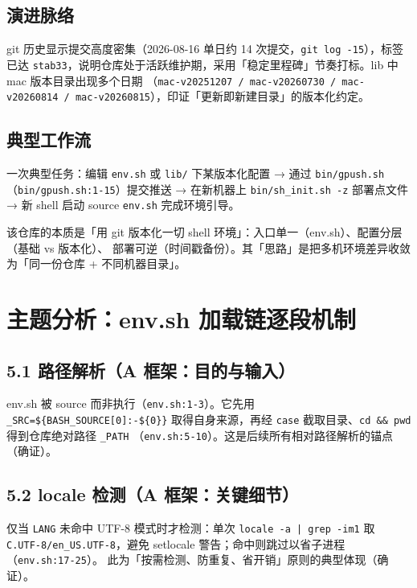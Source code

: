 \documentclass[UTF8]{ctexart}
\begin{document}
\subsection{演进脉络}
git 历史显示提交高度密集（2026-08-16 单日约 14 次提交，\texttt{\nolinkurl{git log -15}}），标签已达
\texttt{stab33}，说明仓库处于活跃维护期，采用「稳定里程碑」节奏打标。lib 中 mac 版本目录出现多个日期
（\texttt{mac-v20251207 / mac-v20260730 / mac-v20260814 / mac-v20260815}），印证「更新即新建目录」的版本化约定。

\subsection{典型工作流}
一次典型任务：编辑 \texttt{env.sh} 或 \texttt{lib/} 下某版本化配置 → 通过 \texttt{bin/gpush.sh}
（\texttt{\nolinkurl{bin/gpush.sh:1-15}}）提交推送 → 在新机器上 \texttt{bin/sh\_init.sh -z} 部署点文件 →
新 shell 启动 source \texttt{env.sh} 完成环境引导。

\begin{ideabox}
该仓库的本质是「用 git 版本化一切 shell 环境」：入口单一（env.sh）、配置分层（基础 vs 版本化）、
部署可逆（时间戳备份）。其「思路」是把多机环境差异收敛为「同一份仓库 + 不同机器目录」。
\end{ideabox}

\section{主题分析：env.sh 加载链逐段机制}
\subsection{5.1 路径解析（A 框架：目的与输入）}
env.sh 被 source 而非执行（\texttt{\nolinkurl{env.sh:1-3}}）。它先用 \texttt{\_SRC=\$\{BASH\_SOURCE[0]:-\$\{0\}\}}
取得自身来源，再经 \texttt{case} 截取目录、\texttt{cd \&\& pwd} 得到仓库绝对路径 \texttt{\_PATH}
（\texttt{\nolinkurl{env.sh:5-10}}）。这是后续所有相对路径解析的锚点（确证）。


\subsection{5.2 locale 检测（A 框架：关键细节）}
仅当 \texttt{LANG} 未命中 UTF-8 模式时才检测：单次 \texttt{locale -a | grep -im1} 取
\texttt{C.UTF-8/en\_US.UTF-8}，避免 setlocale 警告；命中则跳过以省子进程（\texttt{\nolinkurl{env.sh:17-25}}）。
此为「按需检测、防重复、省开销」原则的典型体现（确证）。
\end{document}
